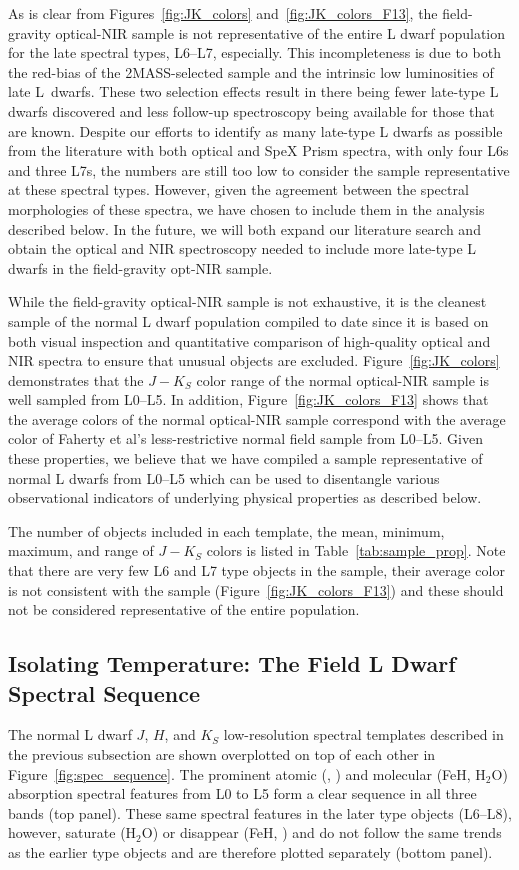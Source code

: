 \documentclass[12pt,preprint]{aastex}
\begin{document}
As is clear from Figures~\ref{fig:JK_colors} and~\ref{fig:JK_colors_F13}, the field-gravity optical-NIR sample is not representative of the entire L dwarf population for the late spectral types, L6--L7, especially. 
This incompleteness is due to both the red-bias of the 2MASS-selected sample and the intrinsic low luminosities of late L~dwarfs.
These two selection effects result in there being fewer late-type L dwarfs discovered and less follow-up spectroscopy being available for those that are known.
Despite our efforts to identify as many late-type L dwarfs as possible from the literature with both optical and SpeX Prism spectra, with only four L6s and three L7s, the numbers are still too low to consider the sample representative at these spectral types.
However, given the agreement between the spectral morphologies of these spectra, we have chosen to include them in the analysis described below.
In the future, we will both expand our literature search and obtain the optical and NIR spectroscopy needed to include more late-type L dwarfs in the field-gravity opt-NIR sample.

While the field-gravity optical-NIR sample is not exhaustive, it is the cleanest sample of the normal L dwarf population compiled to date since it is based on both visual inspection and quantitative comparison of high-quality optical and NIR spectra to ensure that unusual objects are excluded.
Figure~\ref{fig:JK_colors} demonstrates that the $J-K_S$ color range of the normal optical-NIR sample is well sampled from L0--L5. 
In addition, Figure~\ref{fig:JK_colors_F13} shows that the average colors of the normal optical-NIR sample correspond with the average color of Faherty et al's less-restrictive normal field sample from L0--L5. 
Given these properties, we believe that we have compiled a sample representative of normal L dwarfs from L0--L5 which can be used to disentangle various observational indicators of underlying physical properties as described below.

The number of objects included in each template, the mean, minimum, maximum, and range of $J-K_S$ colors is listed in Table~\ref{tab:sample_prop}. Note that there are very few L6 and L7 type objects in the sample, their average color is not consistent with the \cite{Faherty13_0355} sample (Figure~\ref{fig:JK_colors_F13}) and these should not be considered representative of the entire population.

\subsection{Isolating Temperature: The Field L Dwarf Spectral Sequence}
\label{sec:temp}
The normal L dwarf $J$, $H$, and $K_S$ low-resolution spectral templates described in the previous subsection are shown overplotted on top of each other in Figure~\ref{fig:spec_sequence}. 
The prominent atomic (, ) and molecular (FeH, H$_2$O) absorption spectral features from L0 to L5 form a clear sequence in all three bands (top panel).
These same spectral features in the later type objects (L6--L8), however, saturate (H$_2$O) or disappear (FeH, ) and do not follow the same trends as the earlier type objects and are therefore plotted separately (bottom panel).
\end{document}
